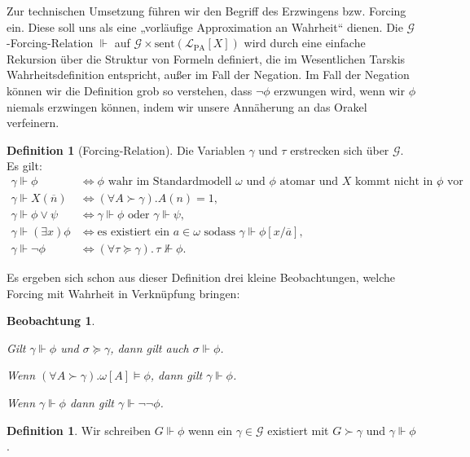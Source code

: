 \documentclass[nofonts]{uebung}
\newtheorem{observation}[theorem]{Beobachtung}
\theoremstyle{definition}
\newtheorem{definition}[theorem]{Definition}
\begin{document}
Zur technischen Umsetzung führen wir den Begriff des Erzwingens bzw. Forcing ein.
Diese soll uns als eine „vorläufige Approximation an Wahrheit“ dienen.
Die $\mathcal G$-Forcing-Relation $\Vdash$ auf $\mathcal G\times \mathrm{sent}(\mathcal L_{\mathrm{PA}}[X])$  wird durch eine einfache Rekursion über die Struktur von Formeln definiert, die im Wesentlichen Tarskis Wahrheitsdefinition entspricht, außer im Fall der Negation.  Im Fall der Negation können wir die Definition grob so verstehen, dass $\neg\phi$ erzwungen wird, wenn wir $\phi$ niemals erzwingen können, indem wir unsere Annäherung an das Orakel verfeinern. 

\begin{definition}[Forcing-Relation]
Die Variablen $\gamma$ und $\tau$ erstrecken sich über $\mathcal G$. Es gilt:
\begin{align*}
    \gamma\Vdash\phi &\iff \phi\text{ wahr im Standardmodell $\omega$ und $\phi$ atomar und $X$ kommt nicht in $\phi$ vor},\\
    \gamma\Vdash X(\overline n)&\iff(\forall A\succ\gamma).A(n)=1,\\
    \gamma\Vdash \phi\lor\psi &\iff\gamma\Vdash\phi\text{ oder } \gamma\Vdash \psi,\\
    \gamma\Vdash(\exists x)\phi &\iff \text{es existiert ein $a\in\omega$ sodass } \gamma\Vdash \phi[x/\overline{a}],\\
    \gamma\Vdash \neg\phi &\iff (\forall \tau\succeq \gamma).\,\tau\not\Vdash\phi.
\end{align*}
\end{definition}

Es ergeben sich schon aus dieser Definition drei kleine Beobachtungen, welche Forcing mit Wahrheit in Verknüpfung bringen:
\begin{observation}
    \begin{thmenum}
    \item \label{obs:forcing-extension} Gilt $\gamma\Vdash\phi$ und $\sigma\succeq \gamma$, dann gilt auch $\sigma\Vdash \phi$.
    \item \label{obs:forcing-by-universaity} Wenn $(\forall A\succ \gamma).\omega[A]\vDash\phi$, dann gilt $\gamma\Vdash\phi$.
    \item Wenn $\gamma\Vdash\phi$ dann gilt $\gamma\Vdash\neg\neg\phi$.
    \end{thmenum}
\end{observation}

\begin{definition}
    Wir schreiben $G\Vdash \phi$ wenn ein $\gamma\in \mathcal G$ existiert mit $G\succ \gamma$ und $\gamma\Vdash\phi$.
\end{definition}
\end{document}
